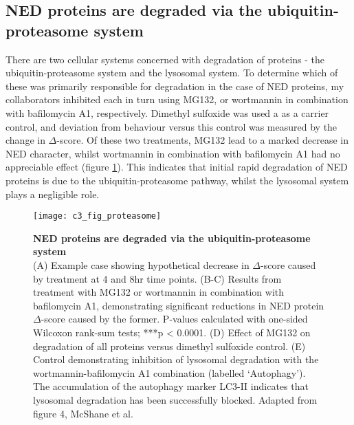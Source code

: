 \documentclass[a4paper,11pt,twoside,openright]{scrbook}
\begin{document}
\subsection{NED proteins are degraded via the ubiquitin-proteasome system}
There are two cellular systems concerned with degradation of proteins - the ubiquitin-proteasome system and the lysosomal system. To determine which of these was primarily responsible for degradation in the case of NED proteins, my collaborators inhibited each in turn using MG132, or wortmannin in combination with bafilomycin A1, respectively. Dimethyl sulfoxide was used a as a carrier control, and deviation from behaviour versus this control was measured by the change in $\Delta$-score. Of these two treatments, MG132 lead to a marked decrease in NED character, whilst wortmannin in combination with bafilomycin A1 had no appreciable effect (figure \ref{figure:proteasome}). This indicates that initial rapid degradation of NED proteins is due to the ubiquitin-proteasome pathway, whilst the lysosomal system plays a negligible role.

\begin{figure}[h]
    \texttt{[image: c3\_fig\_proteasome]}
    \caption[NED proteins are degraded via the ubiquitin-proteasome system]{\sffamily \textbf{NED proteins are degraded via the ubiquitin-proteasome system} \\ \small (A) Example case showing hypothetical decrease in $\Delta$-score caused by treatment at 4 and 8hr time points. (B-C) Results from treatment with MG132 or wortmannin in combination with bafilomycin A1, demonstrating significant reductions in NED protein $\Delta$-score caused by the former. P-values calculated with one-sided Wilcoxon rank-sum tests; ***p < 0.0001. (D) Effect of MG132 on degradation of all proteins versus dimethyl sulfoxide control. (E) Control demonstrating inhibition of lysosomal degradation with the wortmannin-bafilomycin A1 combination (labelled `Autophagy'). The accumulation of the autophagy marker LC3-II indicates that lysosomal degradation has been successfully blocked. Adapted from figure 4, McShane et al.\cite{McShane2016}}
    \label{figure:proteasome}
\end{figure}
\end{document}

